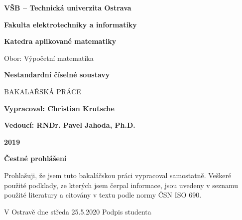 \documentclass[12pt]{book}
\begin{document}
\begin{titlepage}
   \begin{center}
		 		\textbf{VŠB – Technická univerzita Ostrava}
		 			
		 			\vspace{0.5cm}
		 			
		 		\textbf{Fakulta elektrotechniky a informatiky}
		 		
		 		\vspace{0.5cm}
		 		
		 		\textbf{Katedra aplikované matematiky}
		 		
		 		\vspace{1.5cm}
		 		
		 		Obor: Výpočetní matematika
		 		
		 		\vspace{2.5cm}
		 		
       \textbf{{\huge Nestandardní číselné soustavy}}

       \vspace{1cm}

       BAKALAŘSKÁ PRÁCE

       \vspace{3cm}

       \textbf{Vypracoval: Christian Krutsche}

       \vspace{0.5cm}

       \textbf{Vedoucí: RNDr. Pavel Jahoda, Ph.D.}

       \vspace{1cm}

       \textbf{2019}

     	


   \end{center}
\end{titlepage}
	
		\vspace{15cm}

\textbf{Čestné prohlášení}

\begin{center}
	Prohlašuji, že jsem tuto bakalářskou práci vypracoval samostatně. Veškeré použité podklady, ze
kterých jsem čerpal informace, jsou uvedeny v seznamu použité literatury a citovány v textu
podle normy ČSN ISO 690.
\end{center}

\vspace{2.5cm}

V Ostravě dne středa 25.5.2020
Podpis studenta
\end{document}
